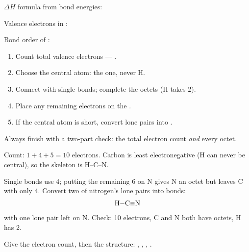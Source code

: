 \documentclass{apchem-notes}
\begin{document}

\begin{warmup}[3]
  \item $\Delta H$ formula from bond energies:
  \item Valence electrons in :
  \item Bond order of : 
\end{warmup}



\begin{enumerate}[leftmargin=*,itemsep=0.2em]
  \item Count total valence electrons ---
        .
  \item Choose the central atom: the
         one, never H.
  \item Connect with single bonds; complete the
         octets (H takes 2).
  \item Place any remaining electrons on the
        .
  \item If the central atom is short, convert lone pairs into
        .
\end{enumerate}

Always finish with a two-part check: the total electron count \emph{and}
every octet.

\begin{workedexample}
Count: $1 + 4 + 5 = 10$ electrons. Carbon is least electronegative (H can
never be central), so the skeleton is H--C--N.

Single bonds use 4; putting the remaining 6 on N gives N an octet but leaves
C with only 4. Convert two of nitrogen's lone pairs into bonds:
\[ \ce{H-C#N} \]
with one lone pair left on N. Check: 10 electrons, C and N both have
octets, H has 2. \checkmark
\end{workedexample}


Give the electron count, then the structure: , ,
, .
\workspace[4.4cm]
\end{document}
